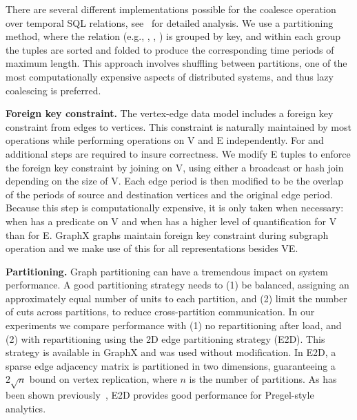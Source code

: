 There are several different implementations possible for the coalesce
operation over temporal SQL relations,
see~\cite{DBLP:conf/vldb/BohlenSS96} for detailed analysis.  We use a
partitioning method, where the relation (e.g., \tv, \te, \trg) is
grouped by key, and within each group the tuples are sorted and folded
to produce the corresponding time periods of maximum length.  This
approach involves shuffling between partitions, one of the most
computationally expensive aspects of distributed systems, and thus
lazy coalescing is preferred.

{\bf Foreign key constraint.} 
The vertex-edge data model includes a foreign key constraint from
edges to vertices.  This constraint is naturally maintained by most
operations while performing operations on V and E independently.  For
 and  additional steps are required to
insure correctness.  We modify E tuples to enforce the foreign key
constraint by joining on V, using either a broadcast or hash join
depending on the size of V.  Each edge period is then modified to be
the overlap of the periods of source and destination vertices and the
original edge period.  Because this step is computationally expensive,
it is only taken when necessary: when  has a predicate
on V and when  has a higher level of quantification
for V than for E.  GraphX graphs maintain foreign key constraint
during subgraph operation and we make use of this for all
representations besides VE.

{\bf Partitioning.}  Graph partitioning can have a tremendous impact
on system performance.  A good partitioning strategy needs to (1) be
balanced, assigning an approximately equal number of units to each
partition, and (2) limit the number of cuts across partitions, to
reduce cross-partition communication.  In our experiments we compare
performance with (1) no repartitioning after load, and (2) with
repartitioning using the 2D edge partitioning strategy (E2D).  This
strategy is available in GraphX and was used without modification.  In
E2D, a sparse edge adjacency matrix is partitioned in two dimensions,
guaranteeing a $2 \sqrt{n}$ bound on vertex replication, where $n$ is
the number of partitions. As has been shown
previously~\cite{DBLP:conf/osdi/GonzalezXDCFS14,MoffittTempWeb16}, E2D
provides good performance for Pregel-style analytics.

